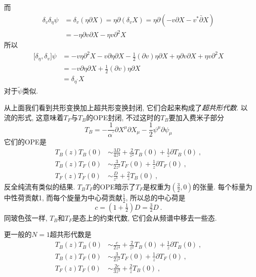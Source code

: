 \begin{tcolorbox}[breakable]
而\begin{align*}
\delta _{v}\delta _{\eta }\psi  &=\delta _{v}(\eta \partial X)=\eta
\partial (\delta _{v}X)=\eta \partial (-v\partial X-v^{\ast }\bar{\partial}X)
\\
&=-\eta \partial v\partial X-\eta v\partial ^{2}X
\end{align*}%
所以\begin{align*}
\lbrack \delta _{\eta },\delta _{v}]\psi  &=-v\eta \partial ^{2}X-v\partial
\eta \partial X-\tfrac{1}{2}(\partial v)\eta \partial X+\eta \partial
v\partial X+\eta v\partial ^{2}X \\
&=-v\partial \eta \partial X+\tfrac{1}{2}(\partial v)\eta \partial X \\
&=\delta _{\eta ^{\prime }}X
\end{align*}%
对于$\tilde{\psi}$类似.
\end{tcolorbox}
从上面我们看到共形变换加上超共形变换封闭, 它们合起来构成了{\emph{超共形代数}}. 以流的形式, 这意味着$T_{F}$与$T_{B}$的OPE封闭, 不过这时的$T_{B}$要加入费米子部分
\begin{equation}
    T_{B}=-\frac{1}{\alpha^{\prime}}\partial X^{\mu}\partial X_{\mu}-\frac{1}{2}\psi^{\mu}\partial\psi_{\mu}
\end{equation}
它们的OPE是
\begin{subequations}
\begin{align}
    T_{B}(z)T_{B}(0)&\sim \frac{3D}{4z^{4}}+\frac{2}{z^{2}}T_{B}(0)+\frac{1}{z}\partial T_{B}(0)\:,\label{10.1.13a}\\
    T_{B}(z)T_{F}(0)&\sim \frac{3}{2z^{2}}T_{F}(0)+\frac{1}{z}\partial T_{F}(0)\:,\label{10.1.13b}\\
    T_{F}(z)T_{F}(0)&\sim \frac{D}{z^{3}}+\frac{2}{z}T_{B}(0) \:,\label{10.1.13c}
\end{align}
\end{subequations}
反全纯流有类似的结果. $T_{B}T_{F}$的OPE暗示了$T_{F}$是权重为$(\frac{3}{2},0)$的张量. 每个标量为中性荷贡献1, 而每个旋量为中心荷贡献$\frac{1}{2}$, 所以总的中心荷是
\begin{equation}
    c=(1+\tfrac{1}{2})D=\tfrac{3}{2}D\:.\label{10.1.14}
\end{equation}
同玻色弦一样, $T_{B}$和$T_{F}$是态上的约束代数, 它们会从频谱中移去一些态.

更一般的$N=1$超共形代数是
\begin{subequations}
\begin{align}
    T_{B}(z)T_{B}(0)&\sim \frac{c}{2z^{4}}+\frac{2}{z^{2}}T_{B}(0)+\frac{1}{z}\partial T_{B}(0)\:,\label{10.1.15a}\\
    T_{B}(z)T_{F}(0)&\sim \frac{3}{2z^{2}}T_{F}(0)+\frac{1}{z}\partial T_{F}(0)\:,\label{10.1.15b}\\
    T_{F}(z)T_{F}(0)&\sim \frac{2c}{3z^{3}}+\frac{2}{z}T_{B}(0) \:,\label{10.1.15c}
\end{align}
\end{subequations}

